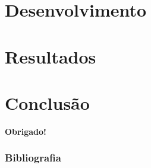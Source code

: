 \documentclass{beamer}
\begin{document}
\section{Desenvolvimento}


\section{Resultados}



\section{Conclusão}


\begin{frame}
    \begin{center}
        \textbf{Obrigado!}
    \end{center}   
\end{frame}

%

\begin{frame}\frametitle{Bibliografia}
	
	
\end{frame}
\end{document}
